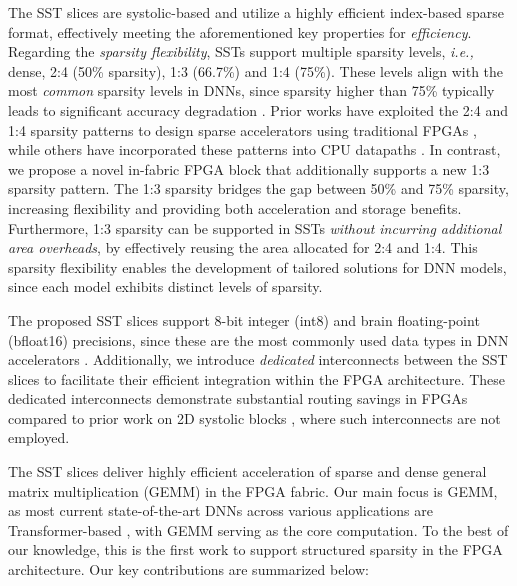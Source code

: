 The SST slices are systolic-based and utilize a highly efficient index-based sparse format, effectively meeting the aforementioned key properties for \textit{efficiency}.
Regarding the \textit{sparsity flexibility}, SSTs support multiple sparsity levels, \emph{i.e.,} dense, 2:4 (50\% sparsity), 1:3 (66.7\%) and 1:4 (75\%).
These levels align with the most \textit{common} sparsity levels in DNNs, since sparsity higher than 75\% typically leads to significant accuracy degradation \cite{Sparse_tensor_GPUs_2019, STA_arxiv_2020, N_M_sparse_transformers_FPGA_VLSI_2022, Learning_N_M_ICLR_2021, Learning_best_N_M_NeurIPS_2022}.
Prior works have exploited the 2:4 and 1:4 sparsity patterns to design sparse accelerators using traditional FPGAs \cite{LAMPS_FCCM_2024, N_M_sparse_transformers_FPGA_VLSI_2022}, while others have incorporated these patterns into CPU datapaths \cite{Vegeta_HPCA_2023, RISC_V_CPU_structured_sparsity_DATE_2024}.
In contrast, we propose a novel in-fabric FPGA block that additionally supports a new 1:3 sparsity pattern.
The 
1:3 sparsity bridges the gap between 50\% and 75\% sparsity, increasing flexibility and providing both acceleration and storage benefits.
Furthermore, 1:3 sparsity can be supported in SSTs 
\textit{without incurring additional area overheads},
by effectively reusing the area allocated for 2:4 and 1:4.
This sparsity flexibility enables the development of tailored solutions for DNN models, since each model exhibits distinct levels of sparsity.




 
The proposed SST slices support 8-bit integer (int8) and brain floating-point (bfloat16) precisions, since these are the most commonly used data types in DNN accelerators \cite{TPUv42021, TPUV2_v3_2021}.
Additionally, we introduce \textit{dedicated} interconnects between the SST slices to facilitate their efficient integration within the FPGA architecture.
These dedicated interconnects demonstrate substantial routing savings in FPGAs compared to prior work on 2D systolic blocks \cite{TS_Aman_FPGA_2021, Aman_TS_TRETS_2022}, where such interconnects are not employed. 





The SST slices deliver highly efficient acceleration of sparse and dense general matrix multiplication (GEMM) in the FPGA fabric.
Our main focus is GEMM, as most current state-of-the-art DNNs across various applications are Transformer-based \cite{Transformers_SOTA_2023, Transformer_SOTA_Elsevier_2024}, with GEMM serving as the core computation. 
To the best of our knowledge, this is the first work to support structured sparsity in the FPGA architecture.
Our key contributions are summarized below:




